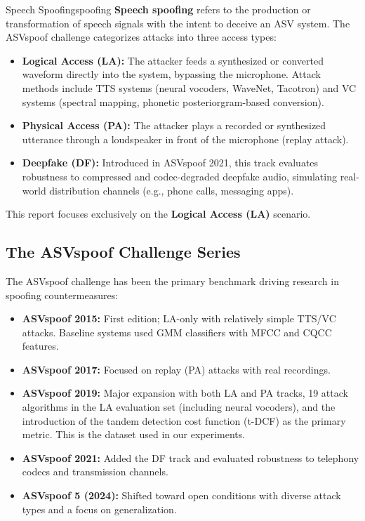 \documentclass[12pt]{report}
\begin{document}
\begin{dfnbox}{Speech Spoofing}{spoofing}
    \textbf{Speech spoofing} refers to the production or transformation of speech signals with the
    intent to deceive an ASV system. The ASVspoof challenge categorizes attacks into three access types:
    \begin{itemize}[noitemsep]
        \item \textbf{Logical Access (LA):} The attacker feeds a synthesized or converted waveform
              directly into the system, bypassing the microphone. Attack methods include
              TTS systems (neural vocoders, WaveNet, Tacotron) and VC systems (spectral mapping,
              phonetic posteriorgram-based conversion).
        \item \textbf{Physical Access (PA):} The attacker plays a recorded or synthesized utterance
              through a loudspeaker in front of the microphone (replay attack).
        \item \textbf{Deepfake (DF):} Introduced in ASVspoof 2021, this track evaluates robustness
              to compressed and codec-degraded deepfake audio, simulating real-world distribution
              channels (e.g., phone calls, messaging apps).
    \end{itemize}
    This report focuses exclusively on the \textbf{Logical Access (LA)} scenario.
\end{dfnbox}

\subsection{The ASVspoof Challenge Series}

The ASVspoof challenge has been the primary benchmark driving research in spoofing countermeasures:

\begin{itemize}[noitemsep]
    \item \textbf{ASVspoof 2015:} First edition; LA-only with relatively simple TTS/VC attacks.
          Baseline systems used GMM classifiers with MFCC and CQCC features.
    \item \textbf{ASVspoof 2017:} Focused on replay (PA) attacks with real recordings.
    \item \textbf{ASVspoof 2019:} Major expansion with both LA and PA tracks, 19 attack algorithms
          in the LA evaluation set (including neural vocoders), and the introduction of the
          tandem detection cost function (t-DCF) as the primary metric. This is the dataset
          used in our experiments.
    \item \textbf{ASVspoof 2021:} Added the DF track and evaluated robustness to telephony
          codecs and transmission channels.
    \item \textbf{ASVspoof 5 (2024):} Shifted toward open conditions with diverse attack types
          and a focus on generalization.
\end{itemize}
\end{document}

